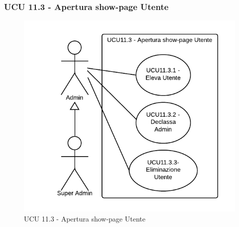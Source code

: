 \subsubsection{UCU 11.3 - Apertura show-page Utente}    
    \begin{figure}[H]
      \begin{center}
      \includegraphics[width=12cm]{UML/UCU 11.3 - Apertura show-page Utente.png}
      \caption{UCU 11.3 - Apertura show-page Utente}
      \end{center} 
    \end{figure}    
    
